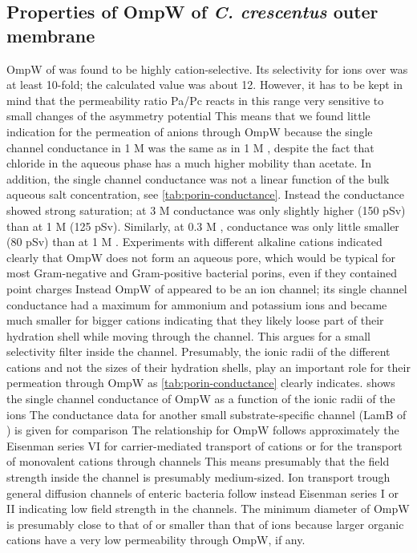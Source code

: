 \subsection{Properties of OmpW of \textit{C. crescentus} outer membrane}
OmpW of \caulobacter was found to be highly cation-selective. Its selectivity for  ions over  was at least 10-fold; the calculated value was about 12. However, it has to be kept in mind that the permeability ratio Pa/Pc reacts in this range very sensitive to small changes of the asymmetry potential This means that we found little indication for the permeation of anions through OmpW because the single channel conductance in 1 M  was the same as in 1 M , despite the fact that chloride in the aqueous phase has a much higher mobility than acetate. In addition, the single channel conductance was not a linear function of the bulk aqueous salt concentration, see \cref{tab:porin-conductance}. Instead the conductance showed strong saturation; at 3 M  conductance was only slightly higher (150 \si{\pico\sievert}) than at 1 M  (125 \si{\pico\sievert}). Similarly, at 0.3 M , conductance was only little smaller (80 \si{\pico\sievert}) than at 1 M . Experiments with different alkaline cations indicated clearly that OmpW does not form an aqueous pore, which would be typical for most Gram-negative and Gram-positive bacterial porins, even if they contained point charges Instead OmpW of \caulobacter appeared to be an ion channel; its single channel conductance had a maximum for ammonium and potassium ions and became much smaller for bigger cations indicating that they likely loose part of their hydration shell while moving through the channel. This argues for a small selectivity filter inside the channel. Presumably, the ionic radii of the different cations and not the sizes of their hydration shells, play an important role for their permeation through OmpW as \cref{tab:porin-conductance} clearly indicates.  shows the single channel conductance of OmpW as a function of the ionic radii of the ions The conductance data for another small substrate-specific channel (LamB of \ecoli) is given for comparison The relationship for OmpW follows approximately the Eisenman series VI for carrier-mediated transport of cations or for the transport of monovalent cations through channels This means presumably that the field strength inside the channel is presumably medium-sized. Ion transport trough general diffusion channels of enteric bacteria follow instead Eisenman series I or II indicating low field strength in the channels. The minimum diameter of OmpW is presumably close to that of  or smaller than that of  ions because larger organic cations have a very low permeability through OmpW, if any. 

